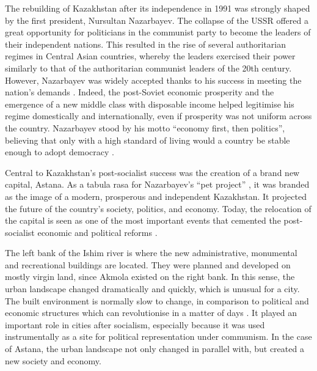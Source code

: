 \documentclass{article}
\begin{document}
The rebuilding of Kazakhstan after its independence in 1991 was strongly shaped by the first president, Nursultan Nazarbayev. The collapse of the USSR offered a great opportunity for politicians in the communist party to become the leaders of their independent nations. This resulted in the rise of several authoritarian regimes in Central Asian countries, whereby the leaders exercised their power similarly to that of the authoritarian communist leaders of the 20th century. However, Nazarbayev was widely accepted thanks to his success in meeting the nation's demands \parencite{isaacs2010papa}. Indeed, the post-Soviet economic prosperity and the emergence of a new middle class with disposable income helped legitimise his regime  domestically and internationally, even if prosperity was not uniform across the country. Nazarbayev stood by his motto ``economy first, then politics'', believing that only with a high standard of living would a country be stable enough to adopt democracy \parencite{kassymbekov_2020}.

Central to Kazakhstan's post-socialist success was the creation of a brand new capital, Astana. As a tabula rasa for Nazarbayev's ``pet project'' \parencite{?}, it was branded as the image of a modern, prosperous and independent Kazakhstan. It projected the future of the country's society, politics, and economy. Today, the relocation of the capital is seen as one of the most important events that cemented the post-socialist economic and political reforms \parencite{kassymbekov_2020}.

The left bank of the Ishim river is where the new administrative, monumental and recreational buildings are located. They were planned and developed on mostly virgin land, since Akmola existed on the right bank. In this sense, the urban landscape changed dramatically and quickly, which is unusual for a city. The built environment is normally slow to change, in comparison to political and economic structures which can revolutionise in a matter of days \parencite{stanilov2007post}. It played an important role in cities after socialism, especially because it was used instrumentally as a site for political representation under communism. In the case of Astana, the urban landscape not only changed in parallel with, but created a new society and economy. 
\end{document}

